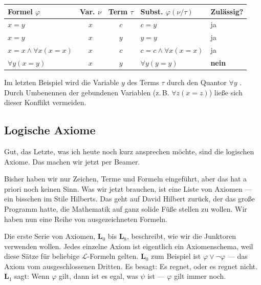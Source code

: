 \begin{math-stroke}
\begin{center}
\begin{tabular}{l | c | c | l | l}
    \toprule
    \textbf{Formel $\varphi$} & \textbf{Var. $\nu$} & \textbf{Term $\tau$} & \textbf{Subst. $\varphi(\nu/\tau)$} & \textbf{Zulässig?} \\ 
    \midrule
    $x = y$ & $x$ & $c$ & $c = y$ & ja \\
    $x = y$ & $x$ & $y$ & $y = y$ & ja \\
    $x = x \wedge \forall x (x = x)$ & $x$ & $c$ & $c = c \wedge \forall x (x = x)$ & ja \\
    $\forall y (x = y)$ & $x$ & $y$ & $\forall y (y = y)$ & \textcolor{BrickRed}{\textbf{nein}} \\
    \bottomrule
\end{tabular}
\end{center}

\begin{explanation-of-steps}
Im letzten Beispiel wird die Variable $y$ des Terms $\tau$ durch den Quantor $\forall y$ . Durch Umbenennen der gebundenen Variablen (z.\,B. $\forall z (x = z)$) ließe sich dieser Konflikt vermeiden.
\end{explanation-of-steps}
\end{math-stroke}

\begin{ai-global-state-checkpoint-invisible-content}
\end{ai-global-state-checkpoint-invisible-content}

\subsection{Logische Axiome}

\begin{spoken-clean}[01:22:27 - 01:25:27]
Gut, das Letzte, was ich heute noch kurz ansprechen möchte, sind die logischen Axiome. Das machen wir jetzt per Beamer. 

Bisher haben wir nur Zeichen, Terme und Formeln eingeführt, aber das hat a priori noch keinen Sinn. Was wir jetzt brauchen, ist eine Liste von Axiomen --- ein bisschen im Stile Hilberts. Das geht auf David Hilbert zurück, der das große Programm hatte, die Mathematik auf ganz solide Füße stellen zu wollen. Wir haben nun eine Reihe von ausgezeichneten Formeln.

Die erste Serie von Axiomen, \textbf{L$_0$} bis \textbf{L$_8$}, beschreibt, wie wir die Junktoren verwenden wollen. Jedes einzelne Axiom ist eigentlich ein Axiomenschema, weil diese Sätze für beliebige $\mathcal{L}$-Formeln gelten. \textbf{L$_0$} zum Beispiel ist $\varphi \vee \neg\varphi$ --- das Axiom vom ausgeschlossenen Dritten. Es besagt: Es regnet, oder es regnet nicht. \textbf{L$_1$} sagt: Wenn $\varphi$ gilt, dann ist es egal, was $\psi$ ist --- $\varphi$ gilt immer noch.
\end{spoken-clean}

